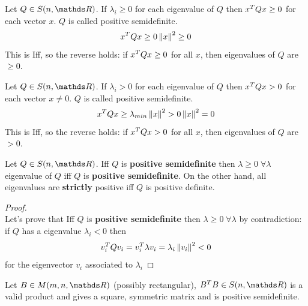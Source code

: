 \documentclass[computationalMathematics.tex]{subfiles}
\begin{document}
\begin{definition}
  Let $Q \in S(n, \R)$. If $\lambda_i \geq 0$ for each eigenvalue of $Q$ then ${x}^{T} Q x \ge 0$ for each vector $x$. $Q$ is called positive semidefinite.
  $$ {x}^{T} Q x \ge 0\left\lVert x\right\rVert^2 \geq 0$$
  This is Iff, so the reverse holds: if ${x}^{T} Q x \ge 0$ for all $x$, then eigenvalues of $Q$ are $\geq 0$.
  \end{definition}

\begin{definition}
    Let $Q \in S(n, \R)$. If $\lambda_i > 0$ for each eigenvalue of $Q$ then ${x}^{T} Q x > 0$ for each vector $x \neq 0$. $Q$ is called positive semidefinite.
    $$ {x}^{T} Q x \ge \lambda_{min}\left\lVert x\right\rVert^2 > 0\left\lVert x\right\rVert^2 = 0$$
    This is Iff, so the reverse holds: if ${x}^{T} Q x > 0$ for all $x$, then eigenvalues of $Q$ are $> 0$.

\end{definition}

\begin{proposition}
  Let $Q \in S(n, \R)$. Iff $Q$ is \textbf{positive semidefinite} then $\lambda \ge 0 \; \forall \lambda$ eigenvalue of $Q$ iff $Q$ is \textbf{positive semidefinite}. On the other hand, all eigenvalues are \textbf{strictly} positive iff $Q$ is positive definite.
\end{proposition}

\begin{proof}~\\
Let's prove that Iff $Q$ is \textbf{positive semidefinite} then $\lambda \ge 0 \; \forall \lambda$ by contradiction:\\
if $Q$ has a eigenvalue $\lambda_i < 0$ then 
$$ v_i^TQv_i = v_i^T \lambda v_i = \lambda_i\left\lVert v_i\right\rVert^2 < 0$$
for the eigenvector $v_i$ associated to $\lambda_i$
  

\end{proof}

\begin{proposition}
  Let $B \in M(m, n, \R)$ (possibly rectangular), $\tr{B} B \in S(n, \R)$ is a valid product
and gives a square, symmetric matrix and is positive semidefinite.
\end{proposition}
\end{document}
